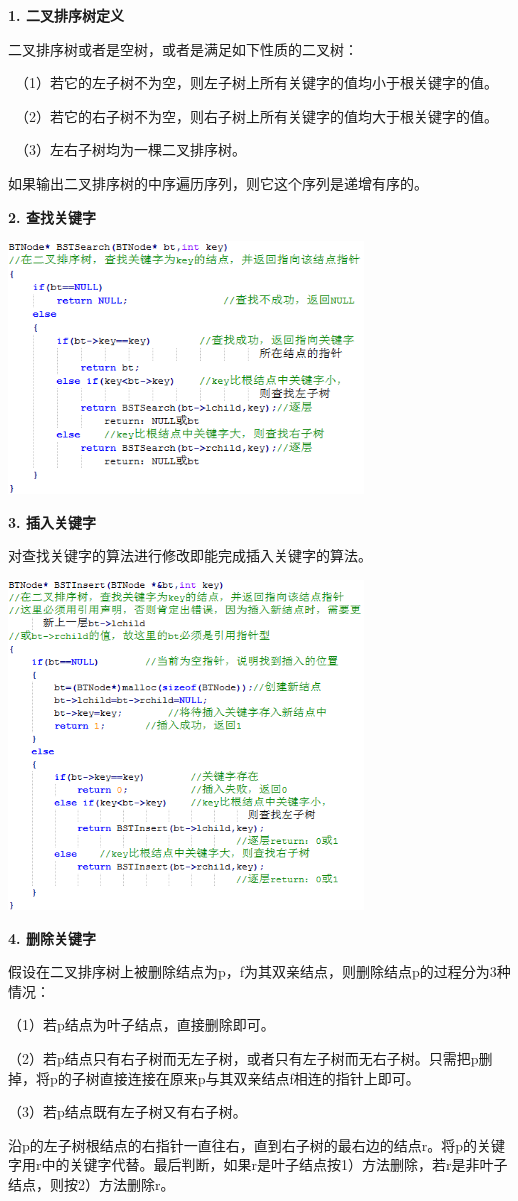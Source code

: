 {\textbf{1. 二叉排序树定义}}

{二叉排序树或者是空树，或者是满足如下性质的二叉树：}

{~（1）若它的左子树不为空，则左子树上所有关键字的值均小于根关键字的值。}

{~（2）若它的右子树不为空，则右子树上所有关键字的值均大于根关键字的值。}

{~（3）左右子树均为一棵二叉排序树。}

{如果输出二叉排序树的中序遍历序列，则它这个序列是递增有序的。}

{\textbf{2. 查找关键字}}

\includegraphics[width=3.70833in,height=2.63542in]{png-jpeg-pics/8CE04083F835D119A23665EED821C55A.png}

{\textbf{3. 插入关键字}}

{对查找关键字的算法进行修改即能完成插入关键字的算法。}

\includegraphics[width=3.70833in,height=3.43750in]{png-jpeg-pics/EAFA52E772727C988A107FA033D79A31.png}

{\textbf{4. 删除关键字}}

{假设在二叉排序树上被删除结点为p，f为其双亲结点，则删除结点p的过程分为3种情况：}

{（1）若p结点为叶子结点，直接删除即可。}

{（2）若p结点只有右子树而无左子树，或者只有左子树而无右子树。只需把p删掉，将p的子树直接连接在原来p与其双亲结点f相连的指针上即可。}

{（3）若p结点既有左子树又有右子树。}

{沿p的左子树根结点的右指针一直往右，直到右子树的最右边的结点r。将p的关键字用r中的关键字代替。最后判断，如果r是叶子结点按1）方法删除，若r是非叶子结点，则按2）方法删除r。}
